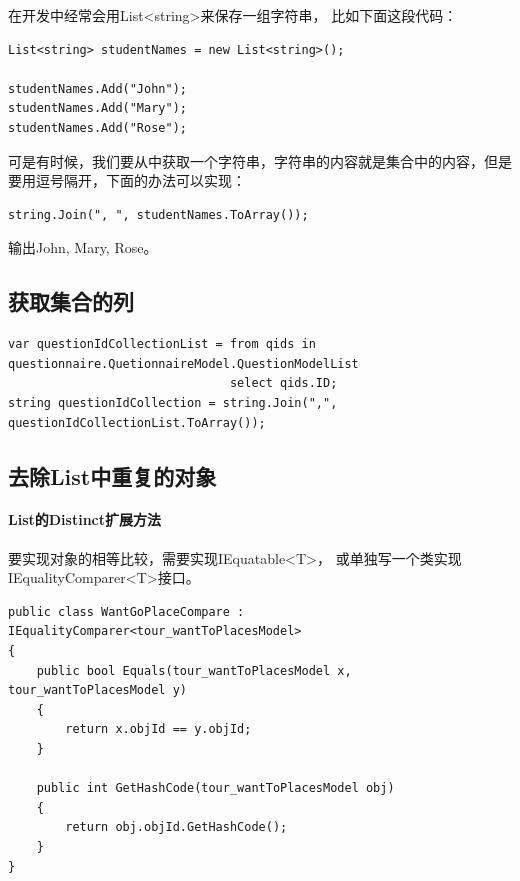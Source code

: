 \documentclass{book}
\begin{document}
在开发中经常会用List<string>来保存一组字符串，
比如下面这段代码：

\begin{lstlisting}[language={[Sharp]C}]
List<string> studentNames = new List<string>();

studentNames.Add("John");
studentNames.Add("Mary");
studentNames.Add("Rose");
\end{lstlisting}

可是有时候，我们要从中获取一个字符串，字符串的内容就是集合中的内容，但是要用逗号隔开，下面的办法可以实现：

\begin{lstlisting}[language={[Sharp]C}]
string.Join(", ", studentNames.ToArray());
\end{lstlisting}

输出John, Mary, Rose。

\subsection{获取集合的列}

\begin{lstlisting}[language={[Sharp]C}]
var questionIdCollectionList = from qids in questionnaire.QuetionnaireModel.QuestionModelList
                               select qids.ID;
string questionIdCollection = string.Join(",", questionIdCollectionList.ToArray());
\end{lstlisting}

\subsection{去除List中重复的对象}

\paragraph{List的Distinct扩展方法}要实现对象的相等比较，需要实现IEquatable<T>，
或单独写一个类实现IEqualityComparer<T>接口。

\begin{lstlisting}[language={[Sharp]C}]
public class WantGoPlaceCompare : IEqualityComparer<tour_wantToPlacesModel>
{
    public bool Equals(tour_wantToPlacesModel x, tour_wantToPlacesModel y)
    {
        return x.objId == y.objId;
    }

    public int GetHashCode(tour_wantToPlacesModel obj)
    {
        return obj.objId.GetHashCode();
    }
}
\end{lstlisting}
\end{document}
